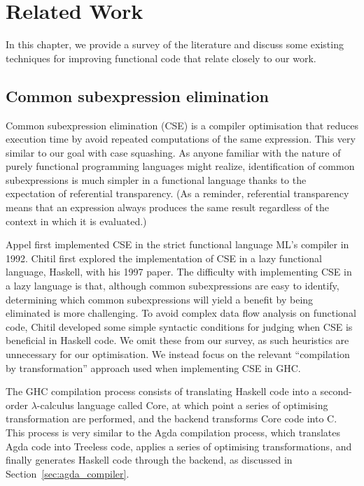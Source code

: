 \chapter{Related Work}
\label{cha:related_work}

In this chapter, we provide a survey of the literature and discuss some existing techniques for improving functional code that relate closely to our work.

\section{Common subexpression elimination}

Common subexpression elimination (CSE) is a compiler optimisation that reduces execution time by avoid repeated computations of the same expression.\cite{chitil1997} This very similar to our goal with case squashing. As anyone familiar with the nature of purely functional programming languages might realize, identification of common subexpressions is much simpler in a functional language thanks to the expectation of referential transparency.\cite{chitil1997} (As a reminder, referential transparency means that an expression always produces the same result regardless of the context in which it is evaluated.)

Appel first implemented CSE in the strict functional language ML's compiler in 1992.\cite{appel1992} Chitil first explored the implementation of CSE in a lazy functional language, Haskell, with his 1997 paper.\cite{chitil1997} The difficulty with implementing CSE in a lazy language is that, although common subexpressions are easy to identify, determining which common subexpressions will yield a benefit by being eliminated is more challenging. To avoid complex data flow analysis on functional code, Chitil developed some simple syntactic conditions for judging when CSE is beneficial in Haskell code.\cite{chitil1997} We omit these from our survey, as such heuristics are unnecessary for our optimisation. We instead focus on the relevant ``compilation by transformation'' approach used when implementing CSE in GHC.

The GHC compilation process consists of translating Haskell code into a second-order $\lambda$-calculus language called Core, at which point a series of optimising transformation are performed, and the backend transforms Core code into C.\cite{chitil1997} This process is very similar to the Agda compilation process, which translates Agda code into Treeless code, applies a series of optimising transformations, and finally generates Haskell code through the backend, as discussed in Section~\ref{sec:agda_compiler}. 

